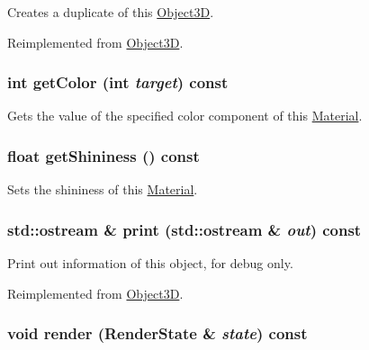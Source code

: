 Creates a duplicate of this \hyperlink{classm3g_1_1Object3D}{Object3D}. 

Reimplemented from \hyperlink{classm3g_1_1Object3D_a25110dac934f867b83b73ad4741a0f4}{Object3D}.\hypertarget{classm3g_1_1Material_d5740043584c6bf87bf014402c5985be}{
\subsubsection[{getColor}]{\setlength{\rightskip}{0pt plus 5cm}int getColor (int {\em target}) const}}
\label{classm3g_1_1Material_d5740043584c6bf87bf014402c5985be}


Gets the value of the specified color component of this \hyperlink{classm3g_1_1Material}{Material}. \hypertarget{classm3g_1_1Material_1bab082fe3510dbe7b98dd07b3976b5b}{
\subsubsection[{getShininess}]{\setlength{\rightskip}{0pt plus 5cm}float getShininess () const}}
\label{classm3g_1_1Material_1bab082fe3510dbe7b98dd07b3976b5b}


Sets the shininess of this \hyperlink{classm3g_1_1Material}{Material}. \hypertarget{classm3g_1_1Material_6fea17fa1532df3794f8cb39cb4f911f}{
\subsubsection[{print}]{\setlength{\rightskip}{0pt plus 5cm}std::ostream \& print (std::ostream \& {\em out}) const}}
\label{classm3g_1_1Material_6fea17fa1532df3794f8cb39cb4f911f}


Print out information of this object, for debug only. 

Reimplemented from \hyperlink{classm3g_1_1Object3D_6fea17fa1532df3794f8cb39cb4f911f}{Object3D}.\hypertarget{classm3g_1_1Material_8babc8a79b78615da51161e94029eea9}{
\subsubsection[{render}]{\setlength{\rightskip}{0pt plus 5cm}void render ({\bf RenderState} \& {\em state}) const}}
\label{classm3g_1_1Material_8babc8a79b78615da51161e94029eea9}


